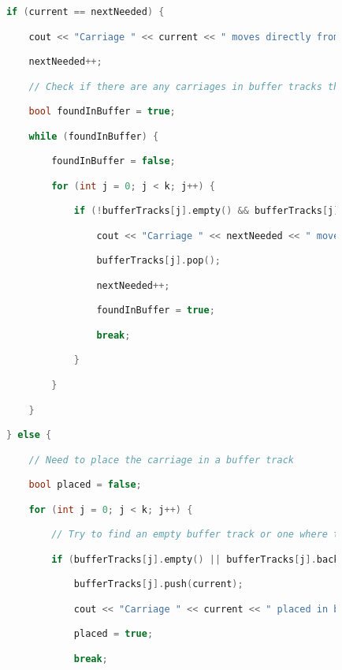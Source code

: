 \begin{lstlisting}[language=C++]
            if (current == nextNeeded) {

                cout << "Carriage " << current << " moves directly from input to output track" << endl;

                nextNeeded++;

                // Check if there are any carriages in buffer tracks that can be moved out

                bool foundInBuffer = true;

                while (foundInBuffer) {

                    foundInBuffer = false;

                    for (int j = 0; j < k; j++) {

                        if (!bufferTracks[j].empty() && bufferTracks[j].front() == nextNeeded) {

                            cout << "Carriage " << nextNeeded << " moves from buffer track " << j+1 << " to output track" << endl;

                            bufferTracks[j].pop();

                            nextNeeded++;

                            foundInBuffer = true;

                            break;

                        }

                    }

                }

            } else {

                // Need to place the carriage in a buffer track

                bool placed = false;

                for (int j = 0; j < k; j++) {

                    // Try to find an empty buffer track or one where the top carriage number is greater than the current one

                    if (bufferTracks[j].empty() || bufferTracks[j].back() > current) {

                        bufferTracks[j].push(current);

                        cout << "Carriage " << current << " placed in buffer track " << j+1 << endl;

                        placed = true;

                        break;


\end{lstlisting}
